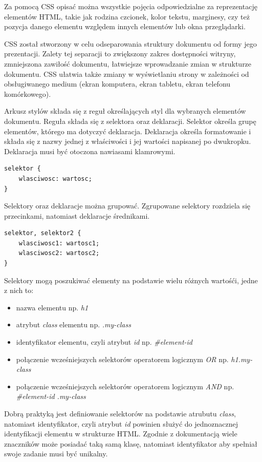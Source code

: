 \documentclass[polish, twoside, 12pt]{mwart}
\begin{document}
Za pomocą CSS opisać można wszystkie pojęcia odpowiedzialne za reprezentację elementów HTML, takie jak rodzina czcionek, kolor tekstu, marginesy, czy też pozycja danego elementu względem innych elementów lub okna przeglądarki.

CSS został stworzony w celu odseparowania struktury dokumentu od formy jego prezentacji. Zalety tej separacji to zwiększony zakres dostępności witryny, zmniejszona zawiłość dokumentu, łatwiejsze wprowadzanie zmian w strukturze dokumentu. CSS ułatwia także zmiany w wyświetlaniu strony w zależności od obsługiwanego medium (ekran komputera, ekran tabletu, ekran telefonu komórkowego).

Arkusz stylów składa się z reguł określających styl dla wybranych elementów dokumentu. Reguła składa się z selektora oraz deklaracji. Selektor określa grupę elementów, którego ma dotyczyć deklaracja. Deklaracja określa formatowanie i składa się z nazwy jednej z właściwości i jej wartości napisanej po dwukropku. Deklaracja musi być otoczona nawiasami klamrowymi.

\begin{lstlisting}
selektor { 
	wlasciwosc: wartosc; 
}
\end{lstlisting}

Selektory oraz deklaracje można grupować. Zgrupowane selektory rozdziela się przecinkami, natomiast deklaracje średnikami.

\begin{lstlisting}
selektor, selektor2 { 
	wlasciwosc1: wartosc1;
	wlasciwosc2: wartosc2;
}
\end{lstlisting}

Selektory mogą poszukiwać elementy na podstawie wielu różnych wartośći, jedne z nich to:

\begin{itemize}
  \item nazwa elementu np. \emph{h1}
  \item atrybut \emph{class} elementu np. \emph{.my-class}
  \item identyfikator elementu, czyli atrybut \emph{id} np. \emph{\#element-id}
  \item połączenie wcześniejszych selektorów operatorem logicznym \emph{OR} np. \emph{h1.my-class}
  \item połączenie wcześniejszych selektorów operatorem logicznym \emph{AND} np. \emph{\#element-id .my-class}
\end{itemize}

Dobrą praktyką jest definiowanie selektorów na podstawie atrubutu \emph{class}, natomiast identyfikator, czyli atrybut \emph{id} powinien służyć do jednoznacznej identyfikacji elementu w strukturze HTML. Zgodnie z dokumentacją wiele znaczników może posiadać taką samą klasę, natomiast identyfikator aby spełniał swoje zadanie musi być unikalny.
\end{document}
